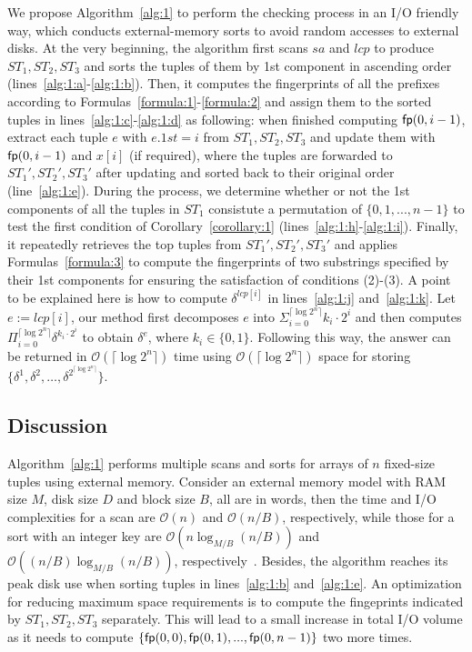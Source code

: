\documentclass[10pt,journal,compsoc]{IEEEtran}
\begin{document}
We propose Algorithm~\ref{alg:1} to perform the checking process in an I/O friendly way, which conducts external-memory sorts to avoid random accesses to external disks.
At the very beginning, the algorithm first scans $sa$ and $lcp$ to produce $ST_1, ST_2, ST_3$ and sorts the tuples of them by 1st component in ascending order (lines~\ref{alg:1:a}-\ref{alg:1:b}).
Then, it computes the fingerprints of all the prefixes according to Formulas~\ref{formula:1}-\ref{formula:2} and assign them to the sorted tuples in lines~\ref{alg:1:c}-\ref{alg:1:d} as following: when finished computing ${\sf fp}(0, i - 1)$, extract each tuple $e$ with $e.1st = i$ from $ST_1, ST_2, ST_3$  and update them with ${\sf fp}(0, i - 1)$ and $x[i]$ (if required), where the tuples are forwarded to $ST_1', ST_2', ST_3'$ after updating and sorted back to their original order (line~\ref{alg:1:e}).
During the process, we determine whether or not the 1st components of all the tuples in $ST_1$ consistute a permutation of $\{0, 1, ..., n - 1\}$ to test the first condition of Corollary~\ref{corollary:1} (lines~\ref{alg:1:h}-\ref{alg:1:i}).
Finally, it repeatedly retrieves the top tuples from $ST_1', ST_2', ST_3'$ and applies Formulas~\ref{formula:3} to compute the fingerprints of two substrings specified by their 1st components for ensuring the satisfaction of conditions (2)-(3). A point to be explained here is how to compute $\delta^{lcp[i]}$ in lines~\ref{alg:1:j} and~\ref{alg:1:k}. Let $e := lcp[i]$, our method first decomposes $e$ into $\Sigma_{i = 0}^{\lceil \log2^n \rceil}{k_i \cdot 2^i}$ and then computes $\Pi_{i = 0}^{\lceil \log2^n \rceil}{\delta}^{k_i \cdot 2^i}$ to obtain $\delta^{e}$, where $k_i \in \{0, 1\}$. Following this way, the answer can be returned in $\mathcal{O}(\lceil \log2^n \rceil)$ time using $\mathcal{O}(\lceil \log2^n \rceil)$ space for storing $\{{\delta}^{1}, {\delta}^{2}, \dots, {\delta}^{2^{\lceil \log2^n \rceil}} \}$.

\subsection{Discussion} \label{sec:method1:discussion}

Algorithm~\ref{alg:1} performs multiple scans and sorts for arrays of $n$ fixed-size tuples using external memory. Consider an external memory model with RAM size $M$, disk size $D$ and block size $B$, all are in words, then the time and I/O complexities for a scan are $\mathcal{O}(n)$ and $\mathcal{O}(n / B)$, respectively, while those for a sort with an integer key are $\mathcal{O}(n\log_{M/ B}(n / B))$ and $\mathcal{O}((n / B)\log_{M / B}(n / B))$, respectively~\cite{Arge2013}. Besides, the algorithm reaches its peak disk use when sorting tuples in lines~\ref{alg:1:b} and~\ref{alg:1:e}. An optimization for reducing maximum space requirements is to compute the fingeprints indicated by $ST_1, ST_2, ST_3$ separately. This will lead to a small increase in total I/O volume as it needs to compute $\{{\sf fp}(0, 0), {\sf fp}(0, 1), ..., {\sf fp}(0, n - 1)\}$ two more times.
	
\end{document}
